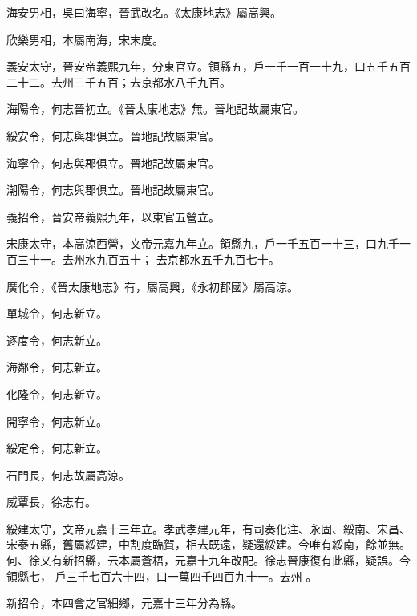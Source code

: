 \begin{pinyinscope}
 海安男相，吳曰海寧，晉武改名。《太康地志》屬高興。



 欣樂男相，本屬南海，宋末度。



 義安太守，晉安帝義熙九年，分東官立。領縣五，戶一千一百一十九，口五千五百二十二。去州三千五百；去京都水八千九百。



 海陽令，何志晉初立。《晉太康地志》無。晉地記故屬東官。



 綏安令，何志與郡俱立。晉地記故屬東官。



 海寧令，何志與郡俱立。晉地記故屬東官。



 潮陽令，何志與郡俱立。晉地記故屬東官。



 義招令，晉安帝義熙九年，以東官五營立。



 宋康太守，本高涼西營，文帝元嘉九年立。領縣九，戶一千五百一十三，口九千一百三十一。去州水九百五十；
 去京都水五千九百七十。



 廣化令，《晉太康地志》有，屬高興，《永初郡國》屬高涼。



 單城令，何志新立。



 逐度令，何志新立。



 海鄰令，何志新立。



 化隆令，何志新立。



 開寧令，何志新立。



 綏定令，何志新立。



 石門長，何志故屬高涼。



 威覃長，徐志有。


綏建太守，文帝元嘉十三年立。孝武孝建元年，有司奏化注、永固、綏南、宋昌、宋泰五縣，舊屬綏建，中割度臨賀，相去既遠，疑還綏建。今唯有綏南，餘並無。何、徐又有新招縣，云本屬蒼梧，元嘉十九年改配。徐志晉康復有此縣，疑誤。今領縣七，
 戶三千七百六十四，口一萬四千四百九十一。去州
 。



 新招令，本四會之官細鄉，元嘉十三年分為縣。




\end{pinyinscope}
